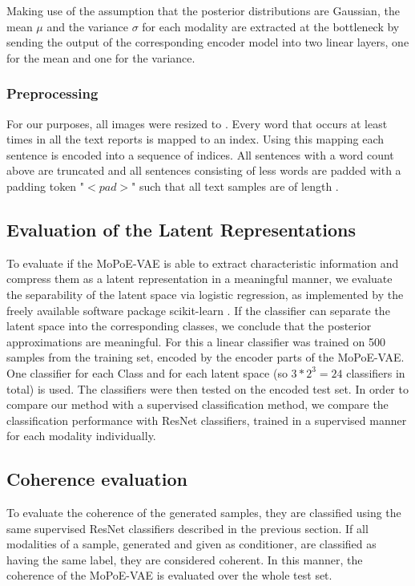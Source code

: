 Making use of the assumption that the posterior distributions are Gaussian, the mean $\mu$ and the variance $\sigma$ for each modality are extracted at the bottleneck by sending the output of the corresponding encoder model into two linear layers, one for the mean and one for the variance.

\subsubsection{Preprocessing}
For our purposes, all images were resized to .
Every word that occurs at least  times in all the text reports is mapped to an index.
Using this mapping each sentence is encoded into a sequence of indices.
All sentences with a word count above  are truncated and all sentences consisting of less words are padded with a padding token "$<pad>$" such that all text samples are of length .

\subsection{Evaluation of the Latent Representations}
To evaluate if the MoPoE-VAE is able to extract characteristic information and compress them as a latent representation in a meaningful manner, we evaluate the separability of the latent space via logistic regression, as implemented by the freely available software package scikit-learn \cite{scikit}.
If the classifier can separate the latent space into the corresponding classes, we conclude that the posterior approximations are meaningful.
For this a linear classifier was trained on 500 samples from the training set, encoded by the encoder parts of the MoPoE-VAE.
One classifier for each Class and for each latent space (so $3*2^3 = 24$ classifiers in total) is used.
The classifiers were then tested on the encoded test set.
In order to compare our method with a supervised classification method, we compare the classification performance with ResNet \cite{he2016deep} classifiers, trained in a supervised manner for each modality individually.

\subsection{Coherence evaluation}
To evaluate the coherence of the generated samples, they are classified using the same supervised ResNet classifiers described in the previous section.
If all modalities of a sample, generated and given as conditioner, are classified as having the same label, they are considered coherent.
In this manner, the coherence of the MoPoE-VAE is evaluated over the whole test set.

